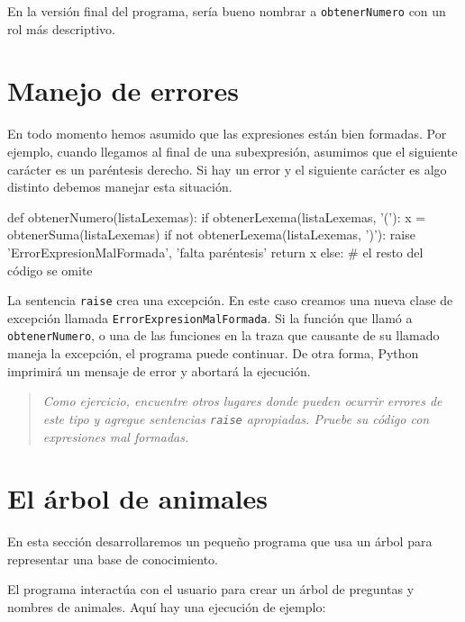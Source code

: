 En la versión final del programa, sería bueno nombrar a \texttt{obtenerNumero}
con un rol más descriptivo.

\section{Manejo de errores}

 

En todo momento hemos asumido que las expresiones están bien formadas.
Por ejemplo, cuando llegamos al final de una subexpresión, asumimos
que el siguiente carácter es un paréntesis derecho. Si hay un error
y el siguiente carácter es algo distinto debemos manejar esta situación.

\beforeverb 
\begin{pythoncode}
def obtenerNumero(listaLexemas):
  if obtenerLexema(listaLexemas, '('):
    x = obtenerSuma(listaLexemas)       
    if not obtenerLexema(listaLexemas, ')'):
      raise 'ErrorExpresionMalFormada', 'falta paréntesis'
    return x
  else:
    # el resto del código se omite
\end{pythoncode}
\afterverb La sentencia \texttt{raise} crea una excepción. En este
caso creamos una nueva clase de excepción llamada \texttt{ErrorExpresionMalFormada}.
Si la función que llamó a \texttt{obtenerNumero}, o una de las funciones
en la traza que causante de su llamado maneja la excepción, el programa
puede continuar. De otra forma, Python imprimirá un mensaje de error
y abortará la ejecución.
\begin{quote}
{\em Como ejercicio, encuentre otros lugares donde pueden ocurrir
errores de este tipo y agregue sentencias \texttt{raise} apropiadas.
Pruebe su código con expresiones mal formadas.} 
\end{quote}

\section{El árbol de animales}

  

En esta sección desarrollaremos un pequeño programa que usa un árbol
para representar una base de conocimiento.

El programa interactúa con el usuario para crear un árbol de preguntas
y nombres de animales. Aquí hay una ejecución de ejemplo:


